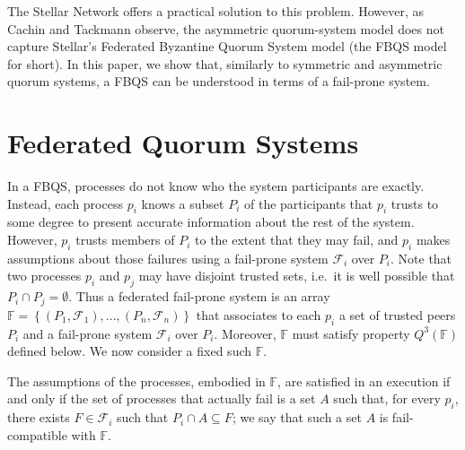 \documentclass[11pt]{article}
\begin{document}
The Stellar Network offers a practical solution to this problem. However, as Cachin and Tackmann observe, the asymmetric quorum-system model does not capture Stellar's Federated Byzantine Quorum System model (the FBQS model for short). In this paper, we show that, similarly to symmetric and asymmetric quorum systems, a FBQS can be understood in terms of a fail-prone system.



\section{Federated Quorum Systems}

In a FBQS, processes do not know who the system participants are exactly.
Instead, each process $p_i$ knows a subset $P_i$ of the participants that $p_i$ trusts to some degree to present accurate information about the rest of the system.
However, $p_i$ trusts members of $P_i$ to the extent that they may fail, and $p_i$ makes assumptions about those failures using a fail-prone system $\mathcal{F}_i$ over $P_i$.
Note that two processes $p_i$ and $p_j$ may have disjoint trusted sets, i.e.\ it is well possible that $P_i\cap P_j=\emptyset$.
Thus a federated fail-prone system is an array $\mathbb{F}=\left\{\left(P_1,\mathcal{F}_1\right),...,\left(P_n,\mathcal{F}_n\right)\right\}$ that associates to each $p_i$ a set of trusted peers $P_i$ and a fail-prone system $\mathcal{F}_i$ over $P_i$. Moreover, $\mathbb{F}$ must satisfy property $Q^3(\mathbb{F})$ defined below.
We now consider a fixed such $\mathbb{F}$.

The assumptions of the processes, embodied in $\mathbb{F}$, are satisfied in an execution if and only if the set of processes that actually fail is a set $A$ such that, for every $p_i$, there exists $F\in\mathcal{F}_i$ such that $P_i\cap A \subseteq F$; we say that such a set $A$ is fail-compatible with $\mathbb{F}$.
\end{document}

